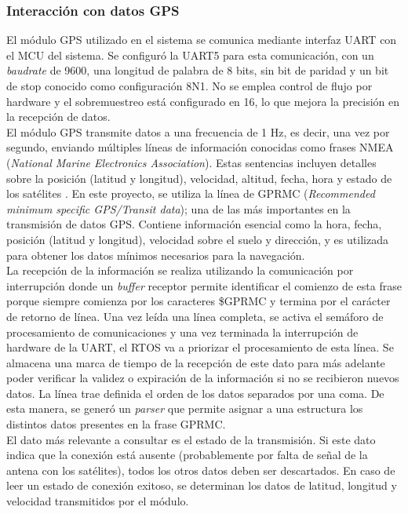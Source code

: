 \subsubsection{Interacción con datos GPS}

El módulo GPS utilizado en el sistema se comunica mediante interfaz UART con el MCU del sistema. Se configuró la UART5 para esta comunicación, con un \textit{baudrate} de 9600, una longitud de palabra de 8 bits, sin bit de paridad y un bit de stop conocido como configuración 8N1. No se emplea control de flujo por hardware y el sobremuestreo está configurado en 16, lo que mejora la precisión en la recepción de datos. \\ 

El módulo GPS transmite datos a una frecuencia de 1 Hz, es decir, una vez por segundo, enviando múltiples líneas de información conocidas como frases NMEA (\textit{National Marine Electronics Association}). Estas sentencias incluyen detalles sobre la posición (latitud y longitud), velocidad, altitud, fecha, hora y estado de los satélites \cite{nmea}. En este proyecto, se utiliza la línea de GPRMC (\textit{Recommended minimum specific GPS/Transit data}); una de las más importantes en la transmisión de datos GPS. Contiene información esencial como la hora, fecha, posición (latitud y longitud), velocidad sobre el suelo y dirección, y es utilizada para obtener los datos mínimos necesarios para la navegación. \\ 

La recepción de la información se realiza utilizando la comunicación por interrupción donde un \textit{buffer} receptor permite identificar el comienzo de esta frase porque siempre comienza por los caracteres \$GPRMC y termina por el carácter de retorno de línea. Una vez leída una línea completa, se activa el semáforo de procesamiento de comunicaciones y una vez terminada la interrupción de hardware de la UART, el RTOS va a priorizar el procesamiento de esta línea. Se almacena una marca de tiempo de la recepción de este dato para más adelante poder verificar la validez o expiración de la información si no se recibieron nuevos datos. La línea trae definida el orden de los datos separados por una coma. De esta manera, se generó un \textit{parser} que permite asignar a una estructura los distintos datos presentes en la frase GPRMC. \\ 

El dato más relevante a consultar es el estado de la transmisión. Si este dato indica que la conexión está ausente (probablemente por falta de señal de la antena con los satélites), todos los otros datos deben ser descartados. En caso de leer un estado de conexión exitoso, se determinan los datos de latitud, longitud y velocidad transmitidos por el módulo. \\
